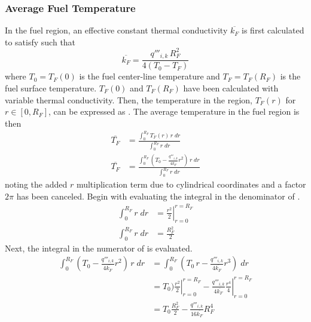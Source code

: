     \subsubsection{Average Fuel Temperature}
      In the fuel region, an effective constant thermal conductivity
      $\overline{k_F}$ is first calculated to satisfy
       such that
      \begin{equation}
        \label{eq:kfuel_constant}
        \overline{k_F} = \frac{q'''_{i,k} \, R_F^2}{4(T_0-T_F)}
      \end{equation}
      where $T_0 = T_F(0)$ is the fuel center-line temperature and
      $T_F=T_F(R_F)$ is the fuel surface temperature.
      $T_F(0)$ and $T_F(R_F)$ have been calculated with variable thermal
      conductivity. Then, the temperature in the region, $T_F(r)$ for $r \in 
      [0,R_F]$, can be expressed as . The average temperature in
      the fuel region is then
      \begin{align}
        \overline{T_F} &= \frac{\int_0^{R_F} T_F(r) \, r \; dr}
          {\int_0^{R_F} r \; dr} \\
        \label{eq:tfbar_integral}
        \overline{T_F} &= \frac{\int_0^{R_F} \left( T_0 - 
          \frac{q'''_{i,k}}{4 \overline{k_F}}
          r^2\right) \, r \; dr}{\int_0^{R_F} r \; dr}
      \end{align}
      noting the added $r$ multiplication term due to cylindrical coordinates
      and a factor $2 \pi$ has been canceled.
      Begin with evaluating the integral in the denominator of
      .
      \begin{align}
        \int_0^{R_F} r \; dr &= \left. \frac{r^2}{2} \right|_{r=0}^{r=R_F} \\
        \label{eq:tf_denominator}
        \int_0^{R_F} r \; dr &= \frac{R_F^2}{2}
      \end{align}
      Next, the integral in the numerator of  is 
      evaluated.
      \begin{align}
        \int_0^{R_F} \left( T_0 - \frac{q'''_{i,k}}{4 \overline{k_F}} r^2 \right)
          \, r \; dr&= 
          \int_0^{R_F} \left( T_0 \, r - \frac{q'''_{i,k}}{4\overline{k_F}} 
          r^3 \right) \; dr\\
        &= \left. T_0) \frac{r^2}{2} \right|_{r=0}^{r=R_F} -
          \left. \frac{q'''_{i,k}}{4 \overline{k_F}} \frac{r^4}{4} 
          \right|_{r=0}^{r=R_F} \\
        \label{eq:tf_numerator}
        &= T_0 \frac{R_F^2}{2} - \frac{q'''_{i,k}}{16 \overline{k_F}} R_F^4
      \end{align}
